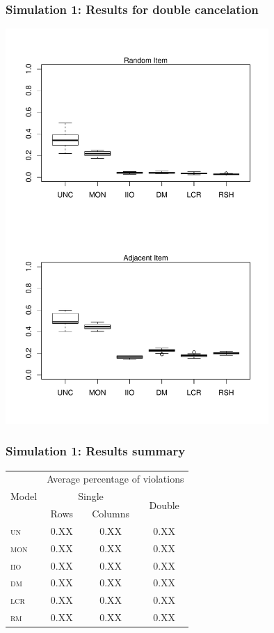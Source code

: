 \documentclass[10pt,serif,professionalfont]{beamer}
\begin{document}
\begin{frame}
    \frametitle{Simulation 1: Results for double cancelation}

    \centering \includegraphics[width=0.75\textwidth, clip, trim = 0 0 0 4.5in]{./figs/boxplots.pdf}

\end{frame}

\begin{frame}
    \frametitle{Simulation 1: Results summary}
    
    \begin{center}
    \begin{tabular}{lccc}
    \toprule
     \multirow{3}{*}{Model} & \multicolumn{3}{c}{Average percentage of violations} \\ \cmidrule(lr){2-4}
                & \multicolumn{2}{c}{Single} & \multirow{2}{*}{Double} \\ \cmidrule(lr){2-3}
                  & Rows       & Columns    &            \\
    \midrule
     \textsc{un}  & 0.XX & 0.XX & 0.XX \\
     \textsc{mon} & 0.XX & 0.XX & 0.XX \\
     \textsc{iio} & 0.XX & 0.XX & 0.XX \\
     \textsc{dm}  & 0.XX & 0.XX & 0.XX \\
     \textsc{lcr} & 0.XX & 0.XX & 0.XX \\
     \textsc{rm}  & 0.XX & 0.XX & 0.XX \\
    \bottomrule
    \end{tabular}
    \end{center}


\end{frame}
\end{document}
